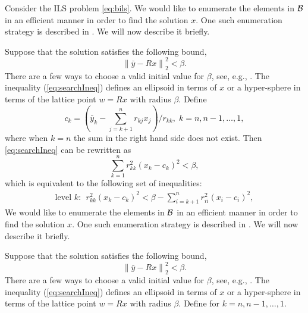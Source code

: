 \documentclass[conference]{IEEEtran}
\begin{document}
Consider the ILS problem \eqref{eq:bils}. We would like to enumerate the
elements in ${\cal B}$ in an efficient manner in order to find the solution $x$.
One such enumeration strategy is described in \cite{ChaH05}. We will now
describe it briefly.

Suppose that the solution satisfies the following bound, 
\begin{equation}
\left \| \bar{y} - Rx \right \|_2^2 < \beta.
\label{eq:searchIneq}
\end{equation}
There are a few ways to choose a valid initial value for $\beta$, see, e.g.,
\cite{ChaH05}. The inequality (\ref{eq:searchIneq}) defines an ellipsoid in terms of $x$ 
or a hyper-sphere in terms of the lattice point $w=Rx$ with radius $\beta$. 
Define
\begin{equation}
 c_k = (\bar{y}_k - \sum_{j=k+1}^nr_{kj}x_j)/r_{kk}, \; k=n, n-1,\ldots, 1,
\label{eq:searchC}
\end{equation}
where when $k=n$ the sum in the right hand side does not exist.
Then \eqref{eq:searchIneq} can be rewritten as
$$
\sum_{k=1}^n r_{kk}^2(x_k-c_k)^2 < \beta,
$$
which  is equivalent to the following
set of inequalities:
\begin{align}
\text{level } k: \ \ r_{kk}^2(x_k-c_k)^2 < \beta -
\sum_{i=k+1}^nr_{ii}^2(x_i-c_i)^2, \label{eq:searchLevelK} 
\end{align} We would like to enumerate the
elements in ${\cal B}$ in an efficient manner in order to find the solution $x$.
One such enumeration strategy is described in \cite{ChaH05}. We will now
describe it briefly.

Suppose that the solution satisfies the following bound, 
\begin{equation}
\left \| \bar{y} - Rx \right \|_2^2 < \beta.
\label{eq:searchIneq}
\end{equation}
There are a few ways to choose a valid initial value for $\beta$, see, e.g.,
\cite{ChaH05}. The inequality (\ref{eq:searchIneq}) defines an ellipsoid in terms of $x$ 
or a hyper-sphere in terms of the lattice point $w=Rx$ with radius $\beta$. 
Define
for $k=n,n-1,\ldots, 1$.
\end{document}
